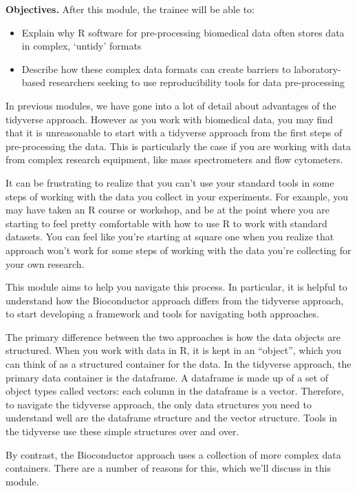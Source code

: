 \documentclass[]{tufte-book}
\providecommand{\tightlist}{%
  \setlength{\itemsep}{0pt}\setlength{\parskip}{0pt}}
\begin{document}
\textbf{Objectives.} After this module, the trainee will be able to:

\begin{itemize}
\tightlist
\item
  Explain why R software for pre-processing biomedical data often stores
  data in complex, `untidy' formats
\item
  Describe how these complex data formats can create barriers to
  laboratory-based researchers seeking to use reproducibility tools for
  data pre-processing
\end{itemize}

In previous modules, we have gone into a lot of detail about advantages of the
tidyverse approach. However as you work with biomedical data, you may find that
it is unreasonable to start with a tidyverse approach from the first steps of
pre-processing the data. This is particularly the case if you are working with
data from complex research equipment, like mass spectrometers and flow
cytometers.

It can be frustrating to realize that you can't use your standard tools
in some steps of working with the data you collect in your experiments.
For example, you may have taken an R course or workshop, and be at the
point where you are starting to feel pretty comfortable with how to use
R to work with standard datasets. You can feel like you're starting at
square one when you realize that approach won't work for some steps of
working with the data you're collecting for your own research.

This module aims to help you navigate this process. In particular, it is helpful
to understand how the Bioconductor approach differs from the tidyverse approach,
to start developing a framework and tools for navigating both approaches.

The primary difference between the two approaches is how the data objects are
structured. When you work with data in R, it is kept in an ``object'', which you
can think of as a structured container for the data. In the tidyverse approach,
the primary data container is the dataframe. A dataframe is made up of a set of
object types called vectors: each column in the dataframe is a vector.
Therefore, to navigate the tidyverse approach, the only data structures you need
to understand well are the dataframe structure and the vector structure. Tools
in the tidyverse use these simple structures over and over.

By contrast, the Bioconductor approach uses a collection of more complex data
containers. There are a number of reasons for this, which we'll discuss in this
module.
\end{document}
